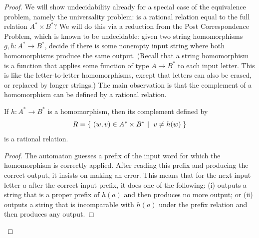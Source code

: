 \begin{proof}
    We will show undecidability already for a special case of the equivalence problem, namely the universality problem: is a rational relation equal to the full relation $A^* \times B^*$?  We will do this via a reduction from the Post Correspondence Problem, which is known to be undecidable: given two string homomorphisms $g,h : A^* \to B^*$, decide if there is some nonempty input string where both homomorphisms produce the same output. (Recall that a string homomorphism is a function that applies some function of type $A \to B^*$ to each input letter. This is like the letter-to-letter homomorphisms, except that letters can also be erased, or replaced by longer strings.)    The main observation is that the complement of a homomorphism can be defined by a rational relation. 

    \begin{claim}\label{claim:homomorphism-complement-rational}
        If $h : A^* \to B^*$ is a homomorphism, then its complement defined by
        \begin{align*}
        R = \setbuild{ (w,v) \in A^* \times B^*}{$v \neq h(w)$}
        \end{align*} 
        is a rational relation.
    \end{claim}

    \begin{proof}
        The automaton guesses a prefix of the input word for which the homomorphism is correctly applied. After reading this prefix and producing the correct output, it insists on making an error. This means that for the next input letter $a$ after the correct input prefix, it does one of the following: (i) outputs a string that is a proper prefix of $h(a)$ and then produces no more output; or (ii) outputs a string that is  incomparable with $h(a)$ under the prefix relation and then produces any output.
    \end{proof}



\end{proof}
